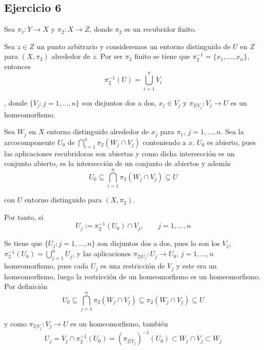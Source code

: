 \documentclass{article}
\begin{document}
\subsection{Ejercicio 6}
Sea $\pi_1:Y\rightarrow X$ y $\pi_2:X\rightarrow Z$, donde $\pi_2$ es un recubridor finito.

Sea $z\in Z$ un punto arbitrario y consideremos un entorno distinguido de $U$ en $Z$ para $(X,\pi_2)$ alrededor de $z$. Por ser $\pi_2$ finito se tiene que $\pi_2^{-1}=\{x_1,\ldots,x_n\}$, entonces
\begin{equation*}
\pi_2^{-1}(U)=\bigcup_{i=1}^n V_i
\end{equation*}

, donde $\{V_j:j=1,\ldots,n\}$ son disjuntos dos a dos, $x_j\in V_j$ y $\pi_{2|V_j}:V_j\rightarrow U$ es un homeomorfismo.

Sea $W_j$ en $X$ entorno distinguido alrededor de $x_j$ para $\pi_1$, $j=1,\ldots,n$. Sea la arcocomponente $U_0$ de $\bigcap_{i=1}^n \pi_2(W_j\cap V_j)$ conteniendo a $x$. $U_0$ es abierto, pues las aplicaciones recubridoras son abiertas y como dicha intersección es un conjunto abierto, es la intersección de un conjunto de abiertos y además
\begin{equation*}
U_0\subseteq \bigcap_{i=1}^n \pi_2(W_j\cap V_j)\subseteq U
\end{equation*}

con $U$ entorno distinguido para $(X,\pi_2)$.

Por tanto, si
\begin{equation*}
U_j:=\pi_2^{-1}(U_0)\cap V_j,\qquad j=1,\ldots, n
\end{equation*}

Se tiene que $\{U_j:j=1,\ldots,n\}$ son disjuntos dos a dos, pues lo son los $V_j$, $\pi_2^{-1}(U_0)=\bigcup_{j=1}^n U_j$, y las aplicaciones $\pi_{2|U_j}:U_j \rightarrow U_0$, $j=1,\ldots,n$ homeomorfismo, pues cada $U_j$ es una restricción de $V_j$ y este era un homeomorfismo, luego la restricción de un homeomorfismo es un homeomorfismo.\\

Por definición
\begin{equation*}
U_0\subseteq \bigcap_{j=1}^n\pi_2(W_j\cap V_j)\subseteq \pi_2(W_j\cap V_j)\subseteq U
\end{equation*}

y como $\pi_{2|V_j}:V_j\rightarrow U$ es un homeomorfismo, también
\begin{equation*}
U_j=V_j\cap \pi_2^{-1}(U_0)=(\pi_{2|V_j})^{-1}(U_0)\subset W_j\cap V_j\subset W_j
\end{equation*}
\end{document}

